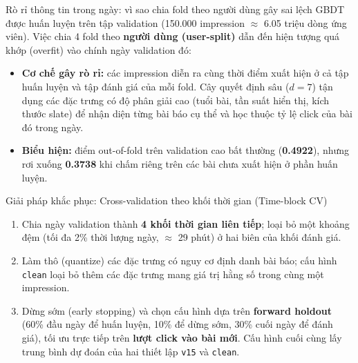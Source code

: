 \documentclass[aspectratio=169,t]{beamer}
\newcommand{\code}[1]{\texttt{#1}}
\begin{document}
\begin{frame}[shrink]{Rò rỉ thông tin trong ngày: vì sao chia fold theo người dùng gây sai lệch}
\scriptsize
GBDT được huấn luyện trên tập validation (150.000 impression $\approx$ 6.05 triệu dòng ứng viên). Việc chia 4 fold theo \textbf{người dùng (user-split)} dẫn đến hiện tượng quá khớp (overfit) vào chính ngày validation đó:
\begin{itemize}
  \setlength{\itemsep}{2pt}
  \item \textbf{Cơ chế gây rò rỉ:} các impression diễn ra cùng thời điểm xuất hiện ở cả tập huấn luyện và tập đánh giá của mỗi fold. Cây quyết định sâu ($d=7$) tận dụng các đặc trưng có độ phân giải cao (tuổi bài, tần suất hiển thị, kích thước slate)
  để nhận diện từng bài báo cụ thể và học thuộc tỷ lệ click của bài đó trong ngày.
  \item \textbf{Biểu hiện:} điểm out-of-fold trên validation cao bất thường (\textbf{0.4922}), nhưng rơi xuống \textbf{0.3738} khi chấm riêng trên các bài chưa xuất hiện ở phần huấn luyện.
\end{itemize}
\begin{block}{Giải pháp khắc phục: Cross-validation theo khối thời gian (Time-block CV)}
\scriptsize
\begin{enumerate}
  \setlength{\itemsep}{1pt}
  \item Chia ngày validation thành \textbf{4 khối thời gian liên tiếp}; loại bỏ một khoảng đệm (tối đa 2\% thời lượng ngày, $\approx$ 29 phút) ở hai biên của khối đánh giá.
  \item Làm thô (quantize) các đặc trưng có nguy cơ định danh bài báo; cấu hình \code{clean} loại bỏ thêm các đặc trưng mang giá trị hằng số trong cùng một impression.
  \item Dừng sớm (early stopping) và chọn cấu hình dựa trên \textbf{forward holdout} (60\% đầu ngày để huấn luyện, 10\% để dừng sớm, 30\% cuối ngày để đánh giá), tối ưu trực tiếp trên \textbf{lượt click vào bài mới}.
  Cấu hình cuối cùng lấy trung bình dự đoán của hai thiết lập \code{v15} và \code{clean}.
\end{enumerate}
\end{block}
\par\kern0pt%
\end{frame}
\end{document}
